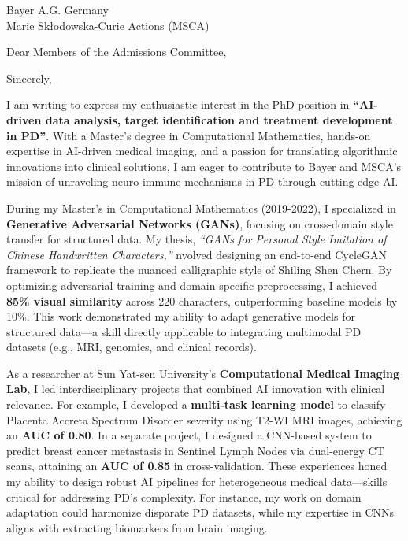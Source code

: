 \documentclass[11pt,a4paper, final]{moderncv}
\begin{document}
{Bayer A.G. Germany\\
Marie Skłodowska-Curie Actions (MSCA)
}
\date{\today}
\opening{Dear Members of the Admissions Committee,}
\closing{Sincerely,}
\makelettertitle
\thispagestyle{empty}
\pagestyle{empty}
I am writing to express my enthusiastic interest in the PhD position 
in \textbf{``AI-driven data analysis, target identification and treatment development in PD''}. 
With a Master's degree in Computational Mathematics, hands-on expertise in AI-driven medical imaging, 
and a passion for translating algorithmic innovations into clinical solutions, 
I am eager to contribute to Bayer and MSCA's mission of unraveling neuro-immune mechanisms in PD through cutting-edge AI.

During my Master's in Computational Mathematics (2019-2022), 
I specialized in \textbf{Generative Adversarial Networks (GANs)}, 
focusing on cross-domain style transfer for structured data. 
My thesis, \emph{``GANs for Personal Style Imitation of Chinese Handwritten Characters,''} 
nvolved designing an end-to-end CycleGAN framework to replicate the nuanced calligraphic style of Shiling Shen Chern. 
By optimizing adversarial training and domain-specific preprocessing, 
I achieved \textbf{85\% visual similarity} across 220 characters, outperforming baseline models by 10\%. 
This work demonstrated my ability to adapt generative models for structured data—a skill directly applicable to integrating multimodal PD datasets (e.g., MRI, genomics, and clinical records).

As a researcher at Sun Yat-sen University's \textbf{Computational Medical Imaging Lab}, 
I led interdisciplinary projects that combined AI innovation with clinical relevance. 
For example, I developed a \textbf{multi-task learning model} to 
classify Placenta Accreta Spectrum Disorder severity using T2-WI MRI images, achieving an \textbf{AUC of 0.80}. 
In a separate project, 
I designed a CNN-based system to predict breast cancer metastasis in Sentinel Lymph Nodes via dual-energy CT scans, 
attaining an \textbf{AUC of 0.85} in cross-validation. 
These experiences honed my ability to design robust AI pipelines for heterogeneous medical data—skills critical for addressing PD's complexity. 
For instance, my work on domain adaptation could harmonize disparate PD datasets, while my expertise in CNNs aligns with extracting biomarkers from brain imaging.
\end{document}
